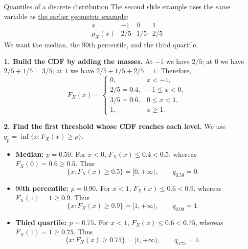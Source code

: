\documentclass[a4paper,12pt,oneside]{report}
\begin{document}
\clearpage
\begin{framedexample}{Quantiles of a discrete distribution}
\label{ex:discrete-quantiles}
The second slide example uses the same variable as
\hyperref[ex:quantile-jump]{the earlier geometric example}:
\[
  \begin{array}{c|ccc}
    x & -1 & 0 & 1\\ \hline
    p_X(x) & 2/5 & 1/5 & 2/5
  \end{array}
\]
We want the median, the $90$th percentile, and the third quartile.

\textbf{1. Build the CDF by adding the masses.}
At $-1$ we have $2/5$; at $0$ we have $2/5+1/5=3/5$;
at $1$ we have $2/5+1/5+2/5=1$. Therefore,
\[
  F_X(x)=
  \begin{cases}
    0, & x<-1,\\
    2/5=0.4, & -1\leq x<0,\\
    3/5=0.6, & 0\leq x<1,\\
    1, & x\geq1.
  \end{cases}
\]

\textbf{2. Find the first threshold whose CDF reaches each level.}
We use $q_p=\inf\{x:F_X(x)\geq p\}$.
\begin{itemize}
  \item \textbf{Median: $p=0.50$.}
    For $x<0$, $F_X(x)\leq0.4<0.5$, whereas $F_X(0)=0.6\geq0.5$.
    Thus
    \[
      \{x:F_X(x)\geq0.5\}=[0,+\infty),
      \qquad \boxed{q_{0.50}=0.}
    \]
  \item \textbf{$90$th percentile: $p=0.90$.}
    For $x<1$, $F_X(x)\leq0.6<0.9$, whereas $F_X(1)=1\geq0.9$.
    Thus
    \[
      \{x:F_X(x)\geq0.9\}=[1,+\infty),
      \qquad \boxed{q_{0.90}=1.}
    \]
  \item \textbf{Third quartile: $p=0.75$.}
    For $x<1$, $F_X(x)\leq0.6<0.75$, whereas $F_X(1)=1\geq0.75$.
    Thus
    \[
      \{x:F_X(x)\geq0.75\}=[1,+\infty),
      \qquad \boxed{q_{0.75}=1.}
    \]
\end{itemize}
\end{framedexample}
\end{document}
